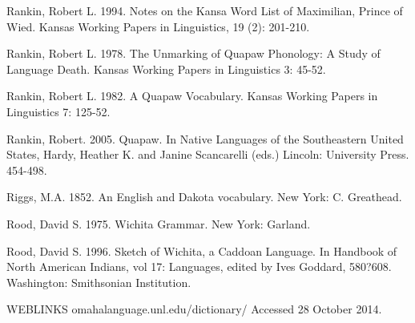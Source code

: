 \documentclass[output=paper]{LSP/langsci}
\begin{document}
\begin{reflist}
Rankin, Robert L. 1994.  Notes on the Kansa Word List of Maximilian, Prince of Wied.  Kansas Working Papers in Linguistics, 19 (2): 201-210.

Rankin, Robert L. 1978. The Unmarking of Quapaw Phonology: A Study of Language Death. Kansas Working Papers in Linguistics 3: 45-52.

Rankin, Robert L. 1982. A Quapaw Vocabulary. Kansas Working Papers in Linguistics 7: 125-52.  

Rankin, Robert. 2005. Quapaw. In Native Languages of the Southeastern United States,  Hardy, Heather K. and Janine Scancarelli (eds.) Lincoln: University Press. 454-498.

Riggs, M.A.  1852.  An English and Dakota vocabulary.  New York: C. Greathead. 

Rood, David S.  1975.  Wichita Grammar.  New York: Garland. 

Rood, David S. 1996. Sketch of Wichita, a Caddoan Language. In Handbook of North American Indians, vol 17: Languages, edited by Ives Goddard, 580?608. Washington: Smithsonian Institution.  

WEBLINKS
omahalanguage.unl.edu/dictionary/  Accessed 28 October 2014.

\end{reflist}
\end{document}
